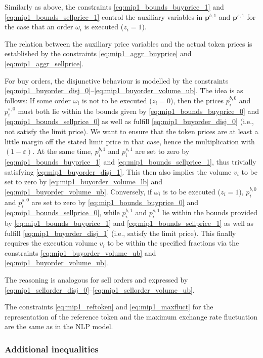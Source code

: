 \documentclass[11pt,parskip=full]{scrartcl}%
\newcommand*{\ie}{i.e., }
\begin{document}
Similarly as above, the constraints \eqref{eq:mip1_bounds_buyprice_1} and
\eqref{eq:mip1_bounds_sellprice_1} control the auxiliary variables in $ \mathbf{p}^{b,1} $ and $
\mathbf{p}^{s,1} $ for the case that an order $ \omega_i $ is executed ($ z_i = 1 $).

The relation between the auxiliary price variables and the actual token prices is established by
the constraints \eqref{eq:mip1_aggr_buyprice} and \eqref{eq:mip1_aggr_sellprice}.

For buy orders, the disjunctive behaviour is modelled by the constraints
\eqref{eq:mip1_buyorder_disj_0}--\eqref{eq:mip1_buyorder_volume_ub}.
The idea is as follows:
If some order $ \omega_i $ is not to be executed ($ z_i = 0 $), then the prices
$ p_i^{b,0} $ and $ p_i^{s,0} $ must both lie within the bounds given by
\eqref{eq:mip1_bounds_buyprice_0} and \eqref{eq:mip1_bounds_sellprice_0} as well as fulfill
\eqref{eq:mip1_buyorder_disj_0} (\ie not satisfy the limit price).
We want to ensure that the token prices are at least a little margin off the stated limit price in
that case, hence the multiplication with $ (1-\varepsilon) $.
At the same time, $ p_i^{b,1} $ and $ p_i^{s,1} $ are set to zero by
\eqref{eq:mip1_bounds_buyprice_1} and \eqref{eq:mip1_bounds_sellprice_1}, thus trivially satisfying
\eqref{eq:mip1_buyorder_disj_1}.
This then also implies the volume $ v_i $ to be set to zero by \eqref{eq:mip1_buyorder_volume_lb}
and \eqref{eq:mip1_buyorder_volume_ub}.
Conversely, if $ \omega_i $ is to be executed ($ z_i = 1 $), $ p_i^{b,0} $ and $ p_i^{s,0} $ are
set to zero by \eqref{eq:mip1_bounds_buyprice_0} and \eqref{eq:mip1_bounds_sellprice_0}, while
$ p_i^{b,1} $ and $ p_i^{s,1} $ lie within the bounds provided by \eqref{eq:mip1_bounds_buyprice_1}
and \eqref{eq:mip1_bounds_sellprice_1} as well as fulfill \eqref{eq:mip1_buyorder_disj_1}
(\ie satisfy the limit price).
This finally requires the execution volume $ v_i $ to be within the specified fractions via the
constraints \eqref{eq:mip1_buyorder_volume_ub} and \eqref{eq:mip1_buyorder_volume_ub}.

The reasoning is analogous for sell orders and expressed by
\eqref{eq:mip1_sellorder_disj_0}--\eqref{eq:mip1_sellorder_volume_ub}.

The constraints \eqref{eq:mip1_reftoken} and \eqref{eq:mip1_maxfluct} for the representation of the
reference token and the maximum exchange rate fluctuation are the same as in the NLP model.


\subsubsection*{Additional inequalities}
\end{document}
